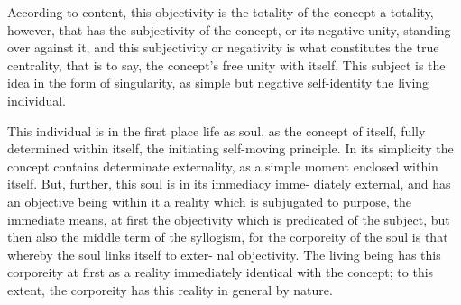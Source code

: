 According to content, this objectivity is the totality of the concept
 a
totality, however, that has the subjectivity of the concept, or its negative
unity, standing over against it, and this subjectivity or negativity is what
constitutes the true centrality, that is to say, the concept's free unity with
itself. This subject is the idea in the form of singularity, as simple but
negative self-identity
 the living individual.

 This individual is in the first place life as soul, as the concept of itself,
fully determined within itself, the initiating self-moving principle. In its
simplicity the concept contains determinate externality, as a simple moment
enclosed within itself.
 But, further, this soul is in its immediacy imme-
diately external, and has an objective being within it
 a reality which is
subjugated to purpose, the immediate means, at first the objectivity which
is predicated of the subject, but then also the middle term of the syllogism,
for the corporeity of the soul is that whereby the soul links itself to exter-
nal objectivity.
 The living being has this corporeity at first as a reality
immediately identical with the concept; to this extent, the corporeity has
this reality in general by nature.

